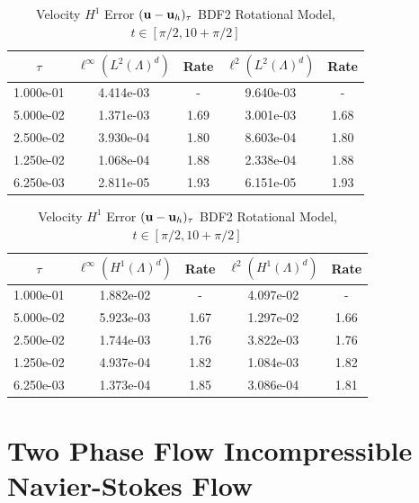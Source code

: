 \documentclass[letterpaper]{erdc}
\begin{document}
\begin{table}[h!]
  \parbox{.45\linewidth}{
  \tiny
  \centering
    \caption{Velocity $L^2$ Error $(\textbf{u} - \textbf{u}_h)_{\tau}$ BDF2 Rotational Model, $t\in[\pi/2, 10+\pi/2]$}
    \begin{tabular}{c|c|c|c|c}
      $\tau$ &  $\ell^{\infty}\left(L^2(\Lambda)^d\right)$ &  Rate  &  $\ell^2\left(L^2(\Lambda)^d\right)$  &  Rate\\
      \hline
      1.000e-01 & 4.414e-03 &  -   & 9.640e-03 &  -  \\
      5.000e-02 & 1.371e-03 & 1.69 & 3.001e-03 & 1.68\\
      2.500e-02 & 3.930e-04 & 1.80 & 8.603e-04 & 1.80\\
      1.250e-02 & 1.068e-04 & 1.88 & 2.338e-04 & 1.88\\
      6.250e-03 & 2.811e-05 & 1.93 & 6.151e-05 & 1.93
    \end{tabular}
    }
    \hfill
    \parbox{.45\linewidth}{
    \tiny
    \centering
      \caption{Velocity $H^1$ Error $(\textbf{u} - \textbf{u}_h)_{\tau}$ BDF2 Rotational Model, $t\in[\pi/2, 10+\pi/2]$}
      \begin{tabular}{c|c|c|c|c}\label{table:lastconvergenceresult}
        $\tau$ &  $\ell^{\infty}\left(H^1(\Lambda)^d\right)$ &  Rate  &  $\ell^2\left(H^1(\Lambda)^d\right)$  &  Rate\\
        \hline
        1.000e-01 & 1.882e-02 &  -   & 4.097e-02 &  -  \\
        5.000e-02 & 5.923e-03 & 1.67 & 1.297e-02 & 1.66\\
        2.500e-02 & 1.744e-03 & 1.76 & 3.822e-03 & 1.76\\
        1.250e-02 & 4.937e-04 & 1.82 & 1.084e-03 & 1.82\\
        6.250e-03 & 1.373e-04 & 1.85 & 3.086e-04 & 1.81
      \end{tabular}
    }
\end{table}


%
%
%
%
\chapter{Two Phase Flow Incompressible Navier-Stokes Flow}\label{ch:2PFlow}
\end{document}
